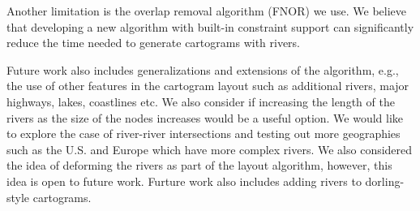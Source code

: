 Another limitation is the overlap removal algorithm (FNOR) we use.
We believe that developing a new algorithm with built-in constraint support can significantly reduce the time needed to generate cartograms with rivers.

Future work also includes generalizations and extensions of the algorithm, e.g., the use of other features in the cartogram layout such as additional rivers, major highways, lakes, coastlines etc.
We also consider if increasing the length of the rivers as the size of the nodes increases would be a useful option.
We would like to explore the case of river-river intersections and testing out more geographies such as the U.S. and Europe which have more complex rivers.
We also considered the idea of deforming the rivers as part of the layout algorithm, however, this idea is open to future work.
Furture work also includes adding rivers to dorling-style cartograms.
